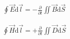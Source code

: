\documentclass[10pt]{minimal}
\begin{document}
\begin{align*}
\oint \vec{E} \mathrm{d} \vec{l}= - \frac{\partial}{\partial t} \iint \vec{B} \mathrm{d}\vec{S}
\end{align*}

\begin{align*}
\oint \vec{H} \mathrm{d} \vec{l}= +\frac{\partial}{\partial t} \iint \vec{D} \mathrm{d}\vec{S}
\end{align*}
\end{document}
